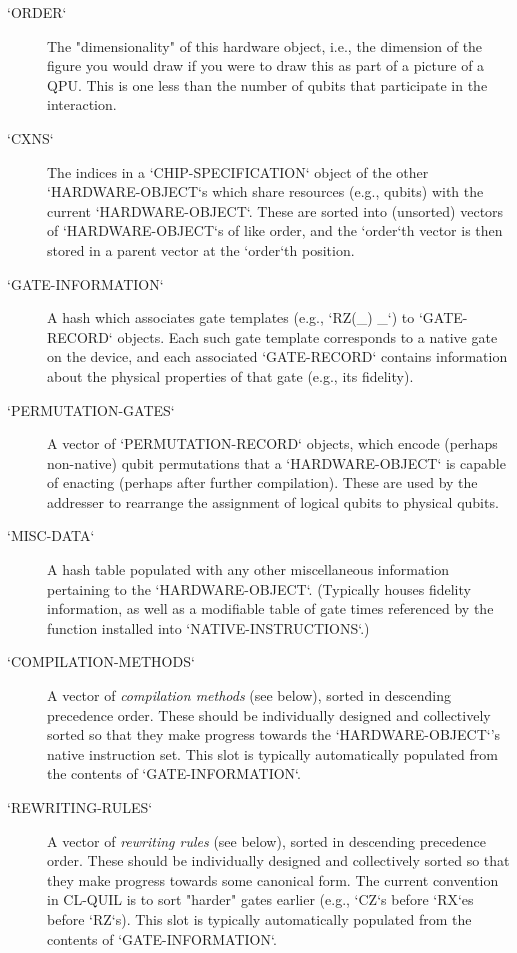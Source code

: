 \begin{description}
	\item[`ORDER`] The "dimensionality" of this hardware object, i.e., the dimension of the figure you would draw if you were to draw this as part of a picture of a QPU.  This is one less than the number of qubits that participate in the interaction.
	\item[`CXNS`] The indices in a `CHIP-SPECIFICATION` object of the other `HARDWARE-OBJECT`s which share resources (e.g., qubits) with the current `HARDWARE-OBJECT`.  These are sorted into (unsorted) vectors of `HARDWARE-OBJECT`s of like order, and the `order`th vector is then stored in a parent vector at the `order`th position.
	\item [`GATE-INFORMATION`] A hash which associates gate templates (e.g., `RZ(_) _`) to `GATE-RECORD` objects.  Each such gate template corresponds to a native gate on the device, and each associated `GATE-RECORD` contains information about the physical properties of that gate (e.g., its fidelity).
	\item[`PERMUTATION-GATES`] A vector of `PERMUTATION-RECORD` objects, which encode (perhaps non-native) qubit permutations that a `HARDWARE-OBJECT` is capable of enacting (perhaps after further compilation).  These are used by the addresser to rearrange the assignment of logical qubits to physical qubits.
	\item[`MISC-DATA`] A hash table populated with any other miscellaneous information pertaining to the `HARDWARE-OBJECT`.  (Typically houses fidelity information, as well as a modifiable table of gate times referenced by the function installed into `NATIVE-INSTRUCTIONS`.)
  \item[`COMPILATION-METHODS`] A vector of \textit{compilation methods} (see below), sorted in descending precedence order.  These should be individually designed and collectively sorted so that they make progress towards the `HARDWARE-OBJECT`'s native instruction set.  This slot is typically automatically populated from the contents of `GATE-INFORMATION`.
  \item[`REWRITING-RULES`] A vector of \textit{rewriting rules} (see below), sorted in descending precedence order.  These should be individually designed and collectively sorted so that they make progress towards some canonical form.  The current convention in CL-QUIL is to sort "harder" gates earlier (e.g., `CZ`s before `RX`es before `RZ`s).  This slot is typically automatically populated from the contents of `GATE-INFORMATION`.
\end{description}

